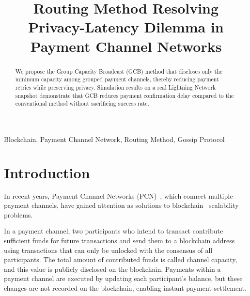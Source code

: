 \documentclass[conference]{IEEEtran}
\begin{document}
\title{Routing Method Resolving Privacy-Latency Dilemma in Payment Channel Networks}

\author{
	\and
}

\maketitle

\begin{abstract}
	We propose the Group Capacity Broadcast (GCB) method that discloses only the minimum capacity among grouped payment channels, thereby reducing payment retries while preserving privacy.
	Simulation results on a real Lightning Network snapshot demonstrate that GCB reduces payment confirmation delay compared to the conventional method without sacrificing success rate.
\end{abstract}

\begin{IEEEkeywords}
	Blockchain, Payment Channel Network, Routing Method, Gossip Protocol
\end{IEEEkeywords}

\section{Introduction}

In recent years, Payment Channel Networks (PCN)~\cite{poon_dryja_2016}, which connect multiple payment channels, have gained attention as solutions to blockchain~\cite{nakamoto2008bitcoin} scalability problems.

In a payment channel, two participants who intend to transact contribute sufficient funds for future transactions and send them to a blockchain address using transactions that can only be unlocked with the consensus of all participants.
The total amount of contributed funds is called channel capacity, and this value is publicly disclosed on the blockchain.
Payments within a payment channel are executed by updating each participant's balance, but these changes are not recorded on the blockchain, enabling instant payment settlement.
\end{document}
